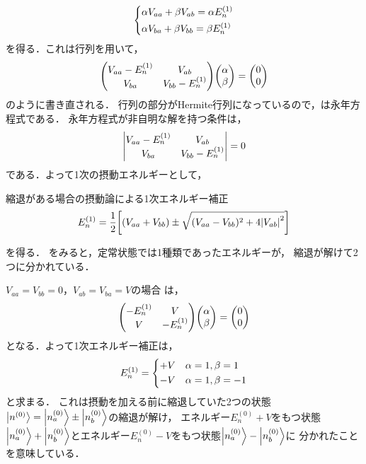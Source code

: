\documentclass{report}
\begin{document}
  \begin{align}
    \begin{dcases}
      \alpha V_{aa} + \beta V_{ab} = \alpha E_n^{(1)}\\
      \alpha V_{ba} + \beta V_{bb} = \beta E_n^{(1)}
    \end{dcases}
  \end{align}
  を得る．これは行列を用いて，
  \begin{align}
    \mqty(
      V_{aa} - E_n^{(1)} & V_{ab} \\
      V_{ba} & V_{bb} - E_n^{(1)})
    \mqty(\alpha\\ \beta)
    =
    \mqty(0 \\ 0)\label{secular-eq}
  \end{align}
  のように書き直される．
  行列の部分がHermite行列になっているので，は永年方程式である．
  永年方程式が非自明な解を持つ条件は，
  \begin{align}
    \mqty|
      V_{aa} - E_n^{(1)} &  V_{ab}\\
      V_{ba} & V_{bb} - E_n^{(1)}|
    = 0
  \end{align}
  である．よって1次の摂動エネルギーとして，
  \begin{itembox}[l]{縮退がある場合の摂動論による1次エネルギー補正}
    \begin{align}
      E_n^{(1)} = \frac{1}{2}\qty[\qty(V_{aa} + V_{bb})\pm\sqrt{(V_{aa} - V_{bb})^2 + 4\abs{V_{ab}}^2}]\label{1st-order-energy-with-degeneracy}
    \end{align}
  \end{itembox}
  を得る．
  をみると，定常状態では1種類であったエネルギーが，
  縮退が解けて2つに分かれている．
  \begin{myex}{}{}
    $ V_{aa} = V_{bb} = 0$，$ V_{ab} = V_{ba} = V$の場合
    は，
    \begin{align}
      \mqty(
        -E_n^{(1)} &  V\\
        V & -E_n^{(1)})
      \mqty(\alpha\\\beta)
      = \mqty(0\\ 0)
    \end{align}
    となる．よって1次エネルギー補正は，
    \begin{align}
      E_n^{(1)}=
      \begin{dcases}
        + V & \alpha = 1, \beta = 1\\
        - V & \alpha = 1, \beta = -1
      \end{dcases}
    \end{align}
    と求まる．
    これは摂動を加える前に縮退していた2つの状態$\ket{n^{(0)}} = \ket{n_a^{(0)}}\pm\ket{n_b^{(0)}}$の縮退が解け，
    エネルギー$E_n^{(0)} + V$をもつ状態$\ket{n_a^{(0)}} + \ket{n_b^{(0)}}$とエネルギー$E_n^{(0)} - V$をもつ状態$\ket{n_a^{(0)}} - \ket{n_b^{(0)}}$に
    分かれたことを意味している．
  \end{myex}
\end{document}
